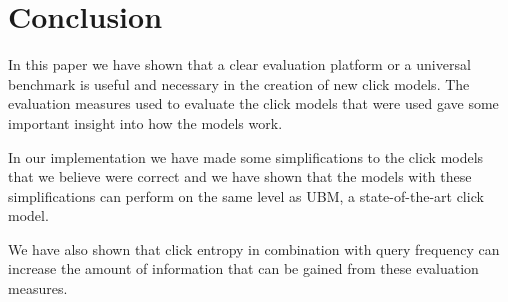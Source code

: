 \section{Conclusion}
\label{sec:conclusion}
In this paper we have shown that a clear evaluation platform or a universal benchmark is useful and necessary in the creation of new click models. The evaluation measures used to evaluate the click models that were used gave some important insight into how the models work. 

In our implementation we have made some simplifications to the click models that we believe were correct and we have shown that the models with these simplifications can perform on the same level as UBM, a state-of-the-art click model.

We have also shown that click entropy in combination with query frequency can increase the amount of information that can be gained from these evaluation measures.
